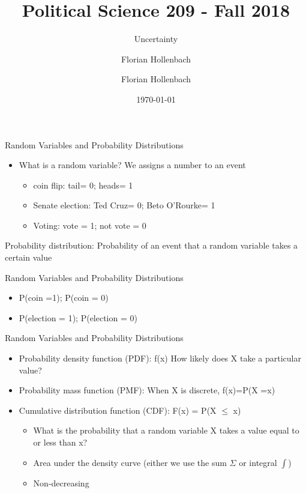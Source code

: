 \documentclass[presentation]{beamer}
\author{Florian Hollenbach}
\author{Florian Hollenbach}
\date{\today}
\title{Political Science 209 - Fall 2018}
\subtitle{Uncertainty}
\begin{document}
\maketitle


\begin{frame}[label={sec:orgbe86744}]{Random Variables and Probability Distributions}
\begin{itemize}
\item What is a random variable? We assigns a number to an event
\begin{itemize}
\item coin flip: tail= 0; heads= 1
\item Senate election: Ted Cruz= 0; Beto O'Rourke= 1
\item Voting: vote = 1; not vote = 0
\end{itemize}
\end{itemize}



\pause

Probability distribution: Probability of an event that a random variable takes a certain value
\end{frame}


\begin{frame}[label={sec:orgfea3f72}]{Random Variables and Probability Distributions}
\begin{itemize}
\item P(coin =1); P(coin = 0)
\item P(election = 1); P(election = 0)
\end{itemize}
\end{frame}


\begin{frame}[label={sec:orgc84f591}]{Random Variables and Probability Distributions}
\begin{itemize}
\item \alert{Probability density function (PDF)}: f(x) How likely does X take a particular value?
\item \alert{Probability mass function (PMF)}: When X is discrete, f(x)=P(X =x)
\end{itemize}

\pause

\begin{itemize}
\item \alert{Cumulative distribution function (CDF)}: F(x) = P(X \(\leq\) x)
\begin{itemize}
\item What is the probability that a random variable X takes a value equal to or less than x?
\item Area under the density curve (either we use the sum \(\Sigma\) or integral \(\int\))
\item Non-decreasing
\end{itemize}
\end{itemize}
\end{frame}
\end{document}
